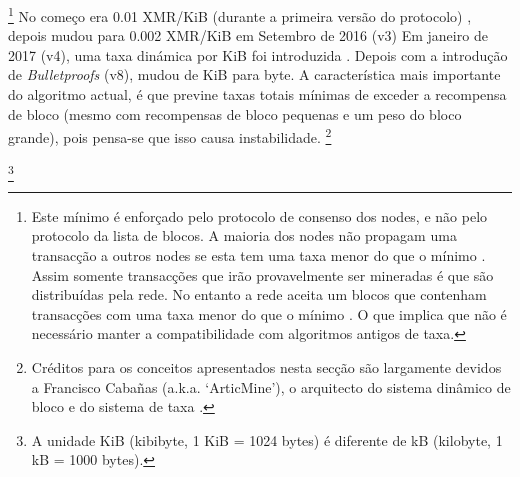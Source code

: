 \footnote{Este mínimo é enforçado pelo protocolo de consenso dos nodes, e não pelo protocolo da lista de blocos. A maioria dos nodes não propagam uma transacção a outros nodes se esta tem uma taxa menor do que o mínimo . Assim somente transacções que irão provavelmente ser mineradas é que são distribuídas pela rede. No entanto a rede aceita um blocos que contenham transacções com uma taxa menor do que o mínimo . O que implica que não é necessário manter a compatibilidade com algoritmos antigos de taxa.}      
No começo era 0.01 XMR/KiB (durante a primeira versão do protocolo) \cite{fee-old-stackexchange}, depois mudou para 0.002 XMR/KiB em Setembro de 2016 (v3)
Em janeiro de 2017 (v4), uma taxa dinámica por KiB foi introduzida \cite{articmine-fee-video, articmine-36c3-dynamics, articmine-defcon27-video, jollymore-old-analysis}. Depois com a introdução de {\em Bulletproofs} (v8), mudou de KiB para byte. A característica mais importante do algoritmo actual, é que previne taxas totais mínimas de exceder a recompensa de bloco (mesmo com recompensas de bloco pequenas e um peso do bloco grande)\cite{fee-reward-instability, no-reward-instability, selfish-miner}, pois pensa-se que isso causa instabilidade. 
\footnote{Créditos para os conceitos apresentados nesta secção são largamente devidos a Francisco Cabañas (a.k.a. `ArticMine'), o arquitecto do sistema dinâmico de bloco e do sistema de taxa \cite{articmine-fee-video, articmine-36c3-dynamics, articmine-defcon27-video}.}   

\footnote{A unidade KiB (kibibyte, 1 KiB = 1024 bytes) é diferente de kB (kilobyte, 1 kB = 1000 bytes).}

